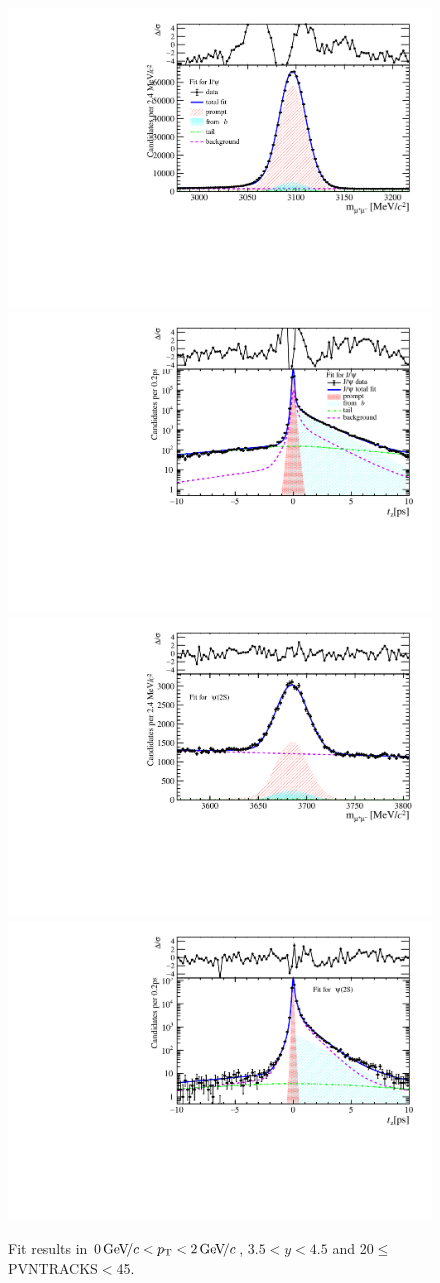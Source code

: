 \begin{figure}[H]
\begin{center}
\includegraphics[width=0.47\linewidth]{pdf/Jpsi/drawmass/n2y3pt1.pdf}
\includegraphics[width=0.47\linewidth]{pdf/Jpsi/2DFit/n2y3pt1.pdf}
\vspace*{-0.5cm}
\includegraphics[width=0.47\linewidth]{pdf/Psi2S/drawmass/n2y3pt1.pdf}
\includegraphics[width=0.47\linewidth]{pdf/Psi2S/2DFit/n2y3pt1.pdf}
\vspace*{-0.5cm}
\end{center}
\caption{Fit results in $0\text{\,Ge\kern -0.1em V\!/}c<p_{\mathrm{T}}<2\text{\,Ge\kern -0.1em V\!/}c$, $3.5<y<4.5$ and 20$\leq$PVNTRACKS$<$45.}
\label{Fitn2y3pt1}
\end{figure}
